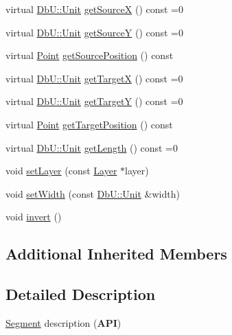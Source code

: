 \begin{DoxyCompactItemize}
\item 
virtual \hyperlink{group__DbUGroup_ga4fbfa3e8c89347af76c9628ea06c4146}{Db\-U\-::\-Unit} \hyperlink{classHurricane_1_1Segment_a0347e3bde8e2e90b05cffdaf2d048710}{get\-Source\-X} () const =0
\item 
virtual \hyperlink{group__DbUGroup_ga4fbfa3e8c89347af76c9628ea06c4146}{Db\-U\-::\-Unit} \hyperlink{classHurricane_1_1Segment_abf305dd4510de6fe6fae5286acbe285a}{get\-Source\-Y} () const =0
\item 
virtual \hyperlink{classHurricane_1_1Point}{Point} \hyperlink{classHurricane_1_1Segment_a270b66556416bdb007b432af70c74e1c}{get\-Source\-Position} () const 
\item 
virtual \hyperlink{group__DbUGroup_ga4fbfa3e8c89347af76c9628ea06c4146}{Db\-U\-::\-Unit} \hyperlink{classHurricane_1_1Segment_abba6713e109a0925c078a9785274f389}{get\-Target\-X} () const =0
\item 
virtual \hyperlink{group__DbUGroup_ga4fbfa3e8c89347af76c9628ea06c4146}{Db\-U\-::\-Unit} \hyperlink{classHurricane_1_1Segment_a27d530abcff9742b81c4b549db161b90}{get\-Target\-Y} () const =0
\item 
virtual \hyperlink{classHurricane_1_1Point}{Point} \hyperlink{classHurricane_1_1Segment_a0d62ebc37a5ffffa8125e1acd724f09f}{get\-Target\-Position} () const 
\item 
virtual \hyperlink{group__DbUGroup_ga4fbfa3e8c89347af76c9628ea06c4146}{Db\-U\-::\-Unit} \hyperlink{classHurricane_1_1Segment_a9f6c42c2de0330aa6a486cdbf550cea1}{get\-Length} () const =0
\item 
void \hyperlink{classHurricane_1_1Segment_acd0b0cd25c824ba7f3b1ff2776c97cf1}{set\-Layer} (const \hyperlink{classHurricane_1_1Layer}{Layer} $\ast$layer)
\item 
void \hyperlink{classHurricane_1_1Segment_aec203d5d3aa96150979ba532d4bd1c7d}{set\-Width} (const \hyperlink{group__DbUGroup_ga4fbfa3e8c89347af76c9628ea06c4146}{Db\-U\-::\-Unit} \&width)
\item 
void \hyperlink{classHurricane_1_1Segment_aceaa61242eb7275cf9c6a39cf1868c53}{invert} ()
\end{DoxyCompactItemize}
\subsection*{Additional Inherited Members}


\subsection{Detailed Description}
\hyperlink{classHurricane_1_1Segment}{Segment} description ({\bfseries A\-P\-I}) 

